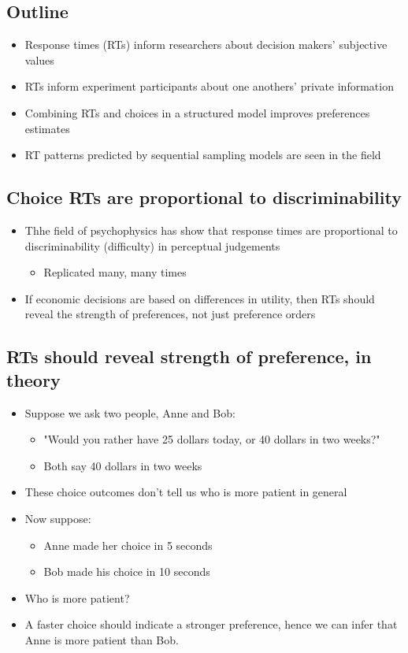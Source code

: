  \subsection{Outline}
 \begin{itemize}
     \item Response times (RTs) inform researchers about decision makers' subjective values
     \item RTs inform experiment participants about one anothers' private information
     \item Combining RTs and choices in a structured model improves preferences estimates
     \item RT patterns predicted by sequential sampling models are seen in the field
 \end{itemize}
 \subsection{Choice RTs are proportional to discriminability}
 \begin{itemize}
     \item Thhe field of psychophysics has show that response times are proportional to discriminability (difficulty) in perceptual judgements
     \begin{itemize}
         \item Replicated many, many times
     \end{itemize}
     \item If economic decisions are based on differences in utility, then RTs should reveal the strength of preferences, not just preference orders
 \end{itemize}
 \subsection{RTs should reveal strength of preference, in theory}
 \begin{itemize}
     \item Suppose we ask two people, Anne and Bob:
     \begin{itemize}
         \item "Would you rather have 25 dollars today, or 40 dollars in two weeks?"
         \item Both say 40 dollars in two weeks
     \end{itemize}
     \item These choice outcomes don't tell us who is more patient in general
     \item Now suppose: 
     \begin{itemize}
         \item Anne made her choice in 5 seconds
         \item Bob made his choice in 10 seconds
     \end{itemize}
     \item Who is more patient?
     \item A faster choice should indicate a stronger preference, hence we can infer that Anne is more patient than Bob. 
 \end{itemize}

